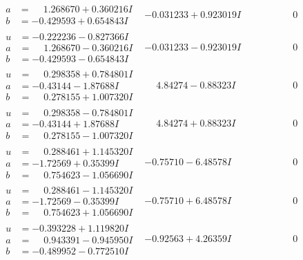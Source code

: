\documentclass[1p]{elsarticle_modified}
\theoremstyle{definition}
\begin{document}
$$\begin{array}{c|c|c}
\begin{aligned}
a &= \phantom{-}1.268670 + 0.360216 I \\
b &= -0.429593 + 0.654843 I\end{aligned}
 & -0.031233 + 0.923019 I & \phantom{-0.000000 } 0 \\ \hline\begin{aligned}
u &= -0.222236 - 0.827366 I \\
a &= \phantom{-}1.268670 - 0.360216 I \\
b &= -0.429593 - 0.654843 I\end{aligned}
 & -0.031233 - 0.923019 I & \phantom{-0.000000 } 0 \\ \hline\begin{aligned}
u &= \phantom{-}0.298358 + 0.784801 I \\
a &= -0.43144 - 1.87688 I \\
b &= \phantom{-}0.278155 + 1.007320 I\end{aligned}
 & \phantom{-}4.84274 - 0.88323 I & \phantom{-0.000000 } 0 \\ \hline\begin{aligned}
u &= \phantom{-}0.298358 - 0.784801 I \\
a &= -0.43144 + 1.87688 I \\
b &= \phantom{-}0.278155 - 1.007320 I\end{aligned}
 & \phantom{-}4.84274 + 0.88323 I & \phantom{-0.000000 } 0 \\ \hline\begin{aligned}
u &= \phantom{-}0.288461 + 1.145320 I \\
a &= -1.72569 + 0.35399 I \\
b &= \phantom{-}0.754623 - 1.056690 I\end{aligned}
 & -0.75710 - 6.48578 I & \phantom{-0.000000 } 0 \\ \hline\begin{aligned}
u &= \phantom{-}0.288461 - 1.145320 I \\
a &= -1.72569 - 0.35399 I \\
b &= \phantom{-}0.754623 + 1.056690 I\end{aligned}
 & -0.75710 + 6.48578 I & \phantom{-0.000000 } 0 \\ \hline\begin{aligned}
u &= -0.393228 + 1.119820 I \\
a &= \phantom{-}0.943391 - 0.945950 I \\
b &= -0.489952 - 0.772510 I\end{aligned}
 & -0.92563 + 4.26359 I & \phantom{-0.000000 } 0 \\ \hline\begin{aligned}

\end{aligned}
\end{array}$$
\end{document}
